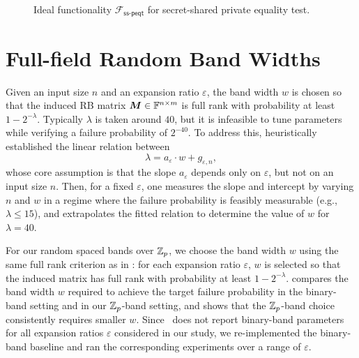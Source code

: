 \begin{figure}[h]
\centering
{}
\caption{Ideal functionality $\mathcal{F}_{\mathsf{ss\mbox{-}peqt}}$ for secret-shared private equality test.}\label{fig:ss-peqt}
\end{figure}

\section{Full-field Random Band Widths}\label{sec:OKVS experiment}

Given an input size $n$ and an expansion ratio $\varepsilon$, the band width $w$ is chosen so that the induced RB matrix $\bm{M} \in \mathbb{F}^{n\times m}$ is full rank with probability at least $1 - 2^{-\lambda}$. Typically $\lambda$ is taken around $40$, but it is infeasible to tune parameters while verifying a failure probability of $2^{-40}$. To address this, \cite{BPSY23} heuristically established the linear relation between
\begin{equation}\label{eq:band_width}
    \lambda = a_{\varepsilon}\cdot w + g_{\varepsilon,n},
\end{equation}
whose core assumption is that the slope $a_\varepsilon$ depends only on $\varepsilon$, but not on an input size $n$. Then, for a fixed $\varepsilon$, one measures the slope and intercept by varying $n$ and $w$ in a regime where the failure probability is feasibly measurable (e.g., $\lambda \le 15$), and extrapolates the fitted relation to determine the value of $w$ for $\lambda = 40$.

For our random spaced bands over \(\mathbb{Z}_p\), we choose the band width \(w\) using the same full rank criterion as in \cite{BPSY23}: for each expansion ratio \(\varepsilon\), \(w\) is selected so that the induced matrix has full rank with probability at least \(1-2^{-\lambda}\).
 compares the band width $w$ required to achieve the target failure probability in the binary-band setting and in our $\mathbb{Z}_p$-band setting, and shows that the $\mathbb{Z}_p$-band choice consistently requires smaller $w$.
Since~\cite{BPSY23} does not report binary-band parameters for all expansion ratios $\varepsilon$ considered in our study, we re-implemented the binary-band baseline and ran the corresponding experiments over a range of $\varepsilon$.

